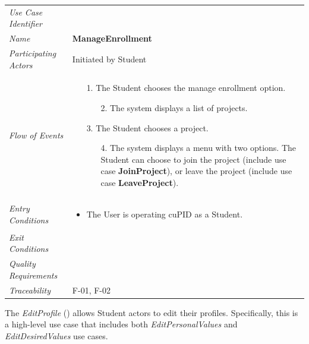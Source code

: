 \documentclass[12pt,letterpaper]{article}
\begin{document}
\begin{center}
	\begin{tabu} to 
		\toprule
		Use Case Identifier &  \\
		Name & {\bf ManageEnrollment} \\
		Participating Actors & Initiated by Student \\
		Flow of Events & 
		\begin{minipage}[t]{\linewidth}
		    \begin{enumerate}
			    \item[1.] The Student chooses the manage enrollment option.
			    \begin{enumerate}
			        \item[2.] The system displays a list of projects.
				\end{enumerate}
				\item[3.] The Student chooses a project.
				\begin{enumerate}
				    \item[4.] The system displays a menu with two options. The Student can choose to join the project (include use case \textbf{JoinProject}), or leave the project (include use case \textbf{LeaveProject}).
				\end{enumerate}
	        \end{enumerate}
		\end{minipage} \\

		Entry Conditions &
		\begin{minipage}[t]{\linewidth}
			\begin{itemize}
			    \item The User is operating cuPID as a Student.
	        \end{itemize}
		\end{minipage} \\

		Exit Conditions & \\


		Quality Requirements & \\

		Traceability & F-01, F-02\\
		\toprule
	\end{tabu}
\end{center}

\newpage{}

The {\it EditProfile} () allows Student actors to edit their profiles. Specifically, this is a high-level use case that includes both {\it EditPersonalValues} and {\it EditDesiredValues} use cases.
\end{document}

